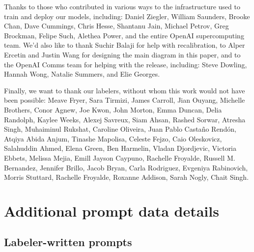 Thanks to those who contributed in various ways to the infrastructure used to train and deploy our models, including: Daniel Ziegler, William Saunders, Brooke Chan, Dave Cummings, Chris Hesse, Shantanu Jain, Michael Petrov, Greg Brockman, Felipe Such, Alethea Power, and the entire OpenAI supercomputing team. We'd also like to thank Suchir Balaji for help with recalibration, to Alper Ercetin and Justin Wang for designing the main diagram in this paper, and to the OpenAI Comms team for helping with the release, including: Steve Dowling, Hannah Wong, Natalie Summers, and Elie Georges.

Finally, we want to thank our labelers, without whom this work would not have been possible: Meave Fryer, Sara Tirmizi, James Carroll, Jian Ouyang, Michelle Brothers, Conor Agnew, Joe Kwon, John Morton, Emma Duncan, Delia Randolph, Kaylee Weeks, Alexej Savreux, Siam Ahsan, Rashed Sorwar, Atresha Singh, Muhaiminul Rukshat, Caroline Oliveira, Juan Pablo Casta{\~n}o Rend{\'o}n, Atqiya Abida Anjum, Tinashe Mapolisa,
Celeste Fejzo, Caio Oleskovicz, Salahuddin Ahmed, Elena Green, Ben Harmelin, Vladan Djordjevic, Victoria Ebbets, Melissa Mejia, Emill Jayson Caypuno, Rachelle Froyalde, Russell M. Bernandez, Jennifer Brillo, Jacob Bryan, Carla Rodriguez, Evgeniya Rabinovich, Morris Stuttard, Rachelle Froyalde, Roxanne Addison, Sarah Nogly, Chait Singh.




 


\newpage

\appendix

\section{Additional prompt data details}
\label{apdx:prompt-data}

\subsection{Labeler-written prompts}

